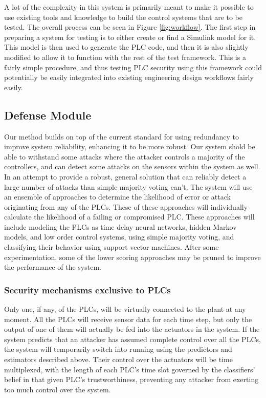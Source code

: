 \documentclass[10pt,twocolumn]{IEEEtran}
\begin{document}
A lot of the complexity in this system is primarily meant to make it possible to use existing tools and knowledge to build the control systems that are to be tested.
The overall process can be seen in Figure \ref{fig:workflow}.
The first step in preparing a system for testing is to either create or find a Simulink model for it.
This model is then used to generate the PLC code, and then it is also slightly modified to allow it to function with the rest of the test framework.
This is a fairly simple procedure, and thus testing PLC security using this framework could potentially be easily integrated into existing engineering design workflows fairly easily.

\subsection{Defense Module} \label{sec:def}
Our method builds on top of the current standard for using redundancy to improve system reliability, enhancing it to be more robust.
Our system shold be able to withstand some attacks where the attacker controls a majority of the controllers, and can detect some attacks on the sensors within the system as well.
In an attempt to provide a robust, general solution that can reliably detect a large number of attacks than simple majority voting can't.
The system will use an ensemble of approaches to determine the likelihood of error or attack originating from any of the PLCs.
These of these approaches will individually calculate the likelihood of a failing or compromised PLC.
These approaches will include modeling the PLCs as time delay neural networks, hidden Markov models, and low order control systems, using simple majority voting, and classifying their behavior using support vector machines.
After some experimentation, some of the lower scoring approaches may be pruned to improve the performance of the system.

\subsubsection{Security mechanisms exclusive to PLCs}
Only one, if any, of the PLCs, will be virtually connected to the plant at any moment.
All the PLCs will receive sensor data for each time step, but only the output of one of them will actually be fed into the actuators in the system.
If the system predicts that an attacker has assumed complete control over all the PLCs, the system will temporarily switch into running using the predictors and estimators described above.
Their control over the actuators will be time multiplexed, with the length of each PLC's time slot governed by the classifiers' belief in that given PLC's trustworthiness, preventing any attacker from exerting too much control over the system.
\end{document}

